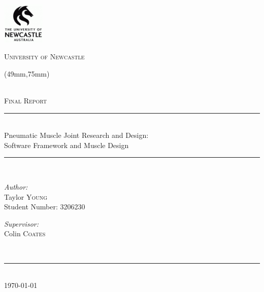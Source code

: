 \begin{titlepage}
    \begin{center}
        \begin{center}
            \includegraphics[width=0.15\textwidth]{./figures/uon_logo.png}
            
            \textsc{\LARGE University of Newcastle}\\[1cm]
        \end{center}
        
        \begin{textblock*}{133mm}(49mm,75mm)  %
            \begin{minipage}[t][65mm][t]{133mm}
                \centering
                ~\\[0.5cm]
                \textsc{\Large Final Report}\\[0.5cm]
            
                \hrule ~\\[0.5cm]
                { \Large Pneumatic Muscle Joint Research and Design:\\ Software Framework and Muscle Design\\[0.5cm] }
                \hrule ~\\[0.5cm]
            
                \noindent
                \begin{minipage}{0.4\textwidth}
                    \begin{flushleft} \large
                        \emph{Author:}\\
                        Taylor \textsc{Young}\\
                        Student Number: 3206230
                    \end{flushleft}
                \end{minipage}%
                \begin{minipage}{0.4\textwidth}
                    \begin{flushright} \large
                        \emph{Supervisor:} \\
                        Colin \textsc{Coates}\\
                    \end{flushright}
                \end{minipage}\\[0.5cm]
                \hrule ~\\[0.3cm]
                {\large \today}
            \end{minipage}
        \end{textblock*}
    \end{center}
    

\end{titlepage}
